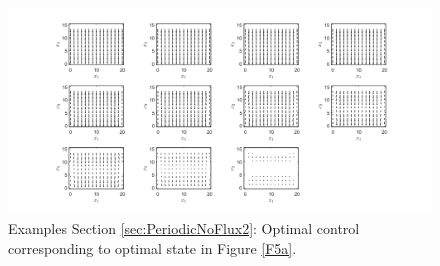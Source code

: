 \documentclass[11pt, a4paper]{article}
\theoremstyle{definition}
\begin{document}
\begin{figure}[h]
	\centering
	\includegraphics[scale=0.35]{ConOptPeri5.png}
	\caption{Examples Section \ref{sec:PeriodicNoFlux2}: Optimal control corresponding to optimal state in Figure \ref{F5a}.} 
	\label{F5b}
\end{figure}
\end{document}
